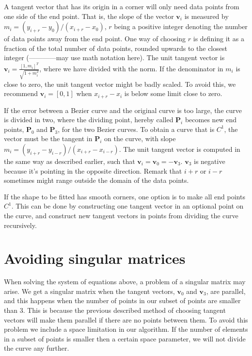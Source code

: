 \documentclass[10pt]{article}
\begin{document}
A tangent vector that has its origin in a corner will only need data points from one side of the end point. That is, the slope of the vector $\mathbf{v}_i$ is measured by $m_i = (y_{i+r} - y_0)/(x_{i+r} - x_0)$, $r$ being a positive integer denoting the number of data points away from the end point. One way of choosing $r$ is defining it as a fraction of the total number of data points, rounded upwards to the closest integer (------------may use math notation here).
 The unit tangent vector is  $\mathbf{v}_i = \frac{[1, m_i]^T}{\sqrt{1+m_i^2}}$, where we have divided with the norm. If the denominator in $m_i$ is close to zero, the unit tangent vector might be badly scaled. To avoid this, we recommend $\mathbf{v}_i = [0,1]$ when $x_{i+r} - x_i$ is below some limit close to zero. 

If the error between a Bezier curve and the original curve is too large, the curve is divided in two, where the dividing point, hereby called $\mathbf{P}_i$ becomes new end points, $\mathbf{P}_0$ and $\mathbf{P}_3$, for the two Bezier curves. To obtain a curve that is $C^1$, the vector must be the tangent in $\mathbf{P}_i$ on the curve, with slope $m_i = (y_{i+r} - y_{i-r})/(x_{i+r} - x_{i-r})$. The unit tangent vector is computed in the same way as described earlier, such that $\mathbf{v}_i = \mathbf{v}_0 = -\mathbf{v}_3$. $\mathbf{v}_3$ is negative because it's pointing in the opposite direction. Remark that $i+r$ or $i-r$ sometimes might range outside the domain of the data points. 

If the shape to be fitted has smooth corners, one option is to make all end points $C^1$. This can be done by constructing one tangent vector in an optional point on the curve, and construct new tangent vectors in points from dividing the curve recursively.


\section*{Avoiding singular matrices}
When solving the system of equations above, a problem of a singular matrix may arise. We get a singular matrix when the tangent vectors, $\mathbf{v}_0$ and $\mathbf{v}_3$, are parallel, and this happens when the number of points in our subset of points are smaller than 3. This is because the previous described method of choosing tangent vectors will make them parallel if there are no points between them. To avoid this problem we include a space limitation in our algorithm. If the number of elements in a subset of points is smaller then a certain space parameter, we will not divide the curve any further.
\end{document}
